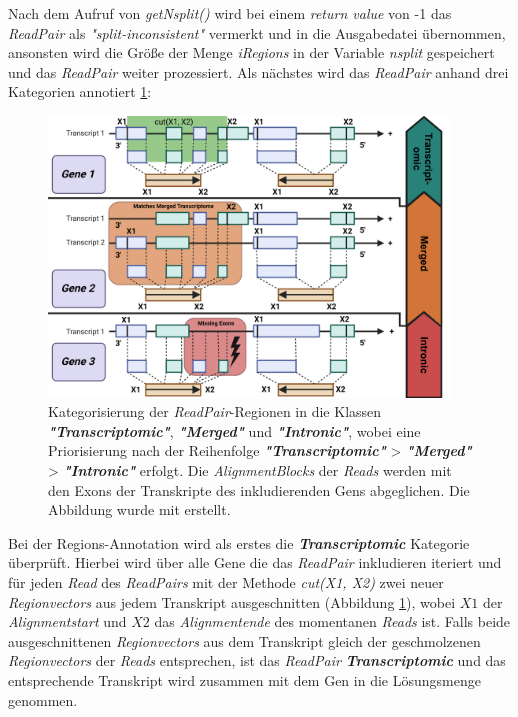 \documentclass[12pt]{article}
\begin{document}
Nach dem Aufruf von \textit{getNsplit()} wird bei einem \textit{return value} von -1 das \textit{ReadPair} als 
\textit{"split-inconsistent"} vermerkt und in die Ausgabedatei übernommen, ansonsten wird die Grö\ss e der
Menge \textit{iRegions} in der Variable \textit{nsplit} gespeichert und das \textit{ReadPair} weiter prozessiert.
\newpage
Als nächstes wird das \textit{ReadPair} anhand drei Kategorien annotiert \ref{fig:-figures-ReadAnnotation-png}:
\begin{figure}[htpb]
    \centering
    \includegraphics[width=0.95\textwidth]{./figures/ReadAnnotation.png}
\caption{Kategorisierung der \textit{ReadPair}-Regionen in die Klassen \textit{\textbf{"Transcriptomic"}},
\textit{\textbf{"Merged"}} und \textit{\textbf{"Intronic"}}, wobei eine Priorisierung nach 
der Reihenfolge \textit{\textbf{"Transcriptomic"}} > \textit{\textbf{"Merged"}} > \textit{\textbf{"Intronic"}} erfolgt.
Die \textit{AlignmentBlocks} der \textit{Reads} werden mit den Exons der Transkripte des inkludierenden Gens abgeglichen. 
Die Abbildung wurde mit \cite{biorender} erstellt.}
    \label{fig:-figures-ReadAnnotation-png}
\end{figure}

Bei der Regions-Annotation wird als erstes die \textit{\textbf{Transcriptomic}} Kategorie überprüft.
Hierbei wird über alle Gene die das \textit{ReadPair} inkludieren iteriert und für jeden \textit{Read} des \textit{ReadPairs} mit der Methode
\textit{cut(X1, X2)} zwei neuer \textit{Regionvectors} aus jedem Transkript  ausgeschnitten (Abbildung \ref{fig:-figures-ReadAnnotation-png}), 
wobei $X1$ der \textit{Alignmentstart} und $X2$ das \textit{Alignmentende} des momentanen \textit{Reads} ist.
Falls beide ausgeschnittenen \textit{Regionvectors} aus dem Transkript gleich der geschmolzenen \textit{Regionvectors} der 
\textit{Reads} entsprechen, ist das \textit{ReadPair} \textit{\textbf{Transcriptomic}} und das entsprechende Transkript
wird zusammen mit dem Gen in die Lösungsmenge genommen.
\end{document}
